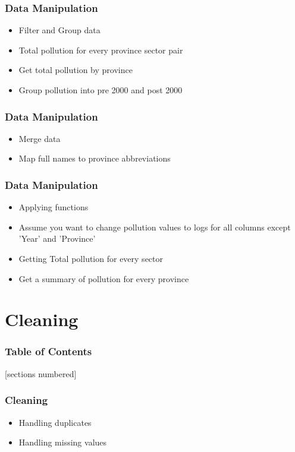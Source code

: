 \documentclass[serif, 9pt, aspectratio=32]{beamer}
\begin{document}
\begin{frame}
    \centering
    \frametitle{Data Manipulation}
    \begin{itemize}
        \setlength{\itemsep}{2em}
        \item Filter and Group data
        \item Total pollution for every province sector pair
        \item Get total pollution by province
        \item Group pollution into pre 2000 and post 2000
    \end{itemize}
\end{frame}

\begin{frame}
    \centering
    \frametitle{Data Manipulation}
    \begin{itemize}
        \setlength{\itemsep}{2em}
        \item Merge data
        \item Map full names to province abbreviations
    \end{itemize}
\end{frame}

\begin{frame}
    \centering
    \frametitle{Data Manipulation}
    \begin{itemize}
        \setlength{\itemsep}{2em}
        \item Applying functions
        \item Assume you want to change pollution values to logs for all columns except 'Year' and 'Province'
        \item Getting Total pollution for every sector
        \item Get a summary of pollution for every province
    \end{itemize}
\end{frame}

\section{Cleaning}

\begin{frame}
    \frametitle{Table of Contents}
    [sections numbered]
    \tableofcontents[currentsection]
\end{frame}

\begin{frame}
    \centering
    \frametitle{Cleaning}
    \begin{itemize}
        \setlength{\itemsep}{2em}
        \item Handling duplicates
        \item Handling missing values
    \end{itemize}
\end{frame}
\end{document}
